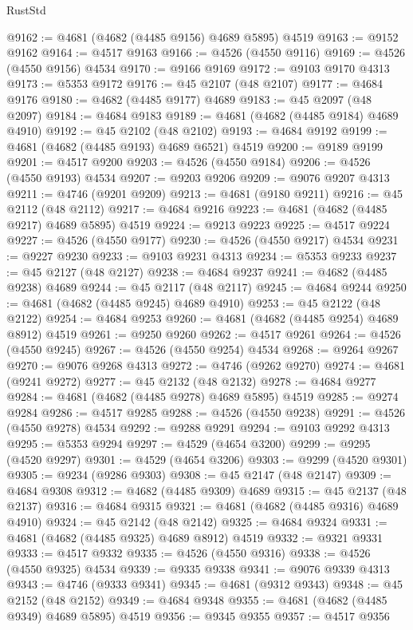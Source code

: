 \begin{lexlean}{RustStd}
\begin{coremodule}
@9162 := @4681 (@4682 (@4485 @9156) @4689 @5895) @4519
@9163 := @9152 @9162
@9164 := @4517 @9163
@9166 := @4526 (@4550 @9116)
@9169 := @4526 (@4550 @9156) @4534
@9170 := @9166 @9169
@9172 := @9103 @9170 @4313
@9173 := @5353 @9172
@9176 := @45 @2107 (@48 @2107)
@9177 := @4684 @9176
@9180 := @4682 (@4485 @9177) @4689
@9183 := @45 @2097 (@48 @2097)
@9184 := @4684 @9183
@9189 := @4681 (@4682 (@4485 @9184) @4689 @4910)
@9192 := @45 @2102 (@48 @2102)
@9193 := @4684 @9192
@9199 := @4681 (@4682 (@4485 @9193) @4689 @6521) @4519
@9200 := @9189 @9199
@9201 := @4517 @9200
@9203 := @4526 (@4550 @9184)
@9206 := @4526 (@4550 @9193) @4534
@9207 := @9203 @9206
@9209 := @9076 @9207 @4313
@9211 := @4746 (@9201 @9209)
@9213 := @4681 (@9180 @9211)
@9216 := @45 @2112 (@48 @2112)
@9217 := @4684 @9216
@9223 := @4681 (@4682 (@4485 @9217) @4689 @5895) @4519
@9224 := @9213 @9223
@9225 := @4517 @9224
@9227 := @4526 (@4550 @9177)
@9230 := @4526 (@4550 @9217) @4534
@9231 := @9227 @9230
@9233 := @9103 @9231 @4313
@9234 := @5353 @9233
@9237 := @45 @2127 (@48 @2127)
@9238 := @4684 @9237
@9241 := @4682 (@4485 @9238) @4689
@9244 := @45 @2117 (@48 @2117)
@9245 := @4684 @9244
@9250 := @4681 (@4682 (@4485 @9245) @4689 @4910)
@9253 := @45 @2122 (@48 @2122)
@9254 := @4684 @9253
@9260 := @4681 (@4682 (@4485 @9254) @4689 @8912) @4519
@9261 := @9250 @9260
@9262 := @4517 @9261
@9264 := @4526 (@4550 @9245)
@9267 := @4526 (@4550 @9254) @4534
@9268 := @9264 @9267
@9270 := @9076 @9268 @4313
@9272 := @4746 (@9262 @9270)
@9274 := @4681 (@9241 @9272)
@9277 := @45 @2132 (@48 @2132)
@9278 := @4684 @9277
@9284 := @4681 (@4682 (@4485 @9278) @4689 @5895) @4519
@9285 := @9274 @9284
@9286 := @4517 @9285
@9288 := @4526 (@4550 @9238)
@9291 := @4526 (@4550 @9278) @4534
@9292 := @9288 @9291
@9294 := @9103 @9292 @4313
@9295 := @5353 @9294
@9297 := @4529 (@4654 @3200)
@9299 := @9295 (@4520 @9297)
@9301 := @4529 (@4654 @3206)
@9303 := @9299 (@4520 @9301)
@9305 := @9234 (@9286 @9303)
@9308 := @45 @2147 (@48 @2147)
@9309 := @4684 @9308
@9312 := @4682 (@4485 @9309) @4689
@9315 := @45 @2137 (@48 @2137)
@9316 := @4684 @9315
@9321 := @4681 (@4682 (@4485 @9316) @4689 @4910)
@9324 := @45 @2142 (@48 @2142)
@9325 := @4684 @9324
@9331 := @4681 (@4682 (@4485 @9325) @4689 @8912) @4519
@9332 := @9321 @9331
@9333 := @4517 @9332
@9335 := @4526 (@4550 @9316)
@9338 := @4526 (@4550 @9325) @4534
@9339 := @9335 @9338
@9341 := @9076 @9339 @4313
@9343 := @4746 (@9333 @9341)
@9345 := @4681 (@9312 @9343)
@9348 := @45 @2152 (@48 @2152)
@9349 := @4684 @9348
@9355 := @4681 (@4682 (@4485 @9349) @4689 @5895) @4519
@9356 := @9345 @9355
@9357 := @4517 @9356

\end{coremodule}
\end{lexlean}
